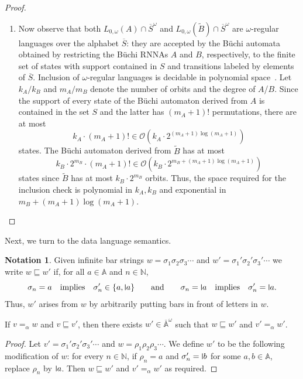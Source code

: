 \documentclass[final,a4paper,UKenglish,thm-restate,autoref,numberwithinsect]{lipics-v2021}
\newcommand{\midmid}{\hspace{0.2ex}{\rule[-0.1ex]{0.6pt}{1.65ex}}\hspace{0.2ex}}
\newcommand{\newletter}[1]{{\midmid}#1}
\newcommand{\barA}{\overline{\names}}
\numberwithin{equation}{section}
\newcommand{\CO}{\mathcal{O}}
\newcommand{\ol}{\overline}
\newcommand{\tl}{\widetilde}
\newcommand{\Nat}{{\mathbb{N}}}
\newcommand{\+}[1]{\mathcal{#1}\xspace}
\newcommand{\names}{\mathbb{A}}
\theoremstyle{definition}
\newtheorem{nota}[theorem]{Notation}
\begin{document}
\begin{proof}
\begin{enumerate}
  \item Now observe that both $L_{0,\omega}(A)\cap \ol{S}^\omega$ and
    $L_{0,\omega}(\tl{B})\cap \ol{S}^\omega$ are $\omega$-regular
    languages over the alphabet $\ol{S}$: they are accepted by the
    Büchi automata obtained by restricting the Büchi RNNAs $A$ and
    $B$, respectively, to the finite set of states with support
    contained in $S$ and transitions labeled by elements of
    $\ol{S}$. Inclusion of $\omega$-regular languages is decidable in
    polynomial space~\cite{kv96}. Let $k_A/k_B$ and $m_A/m_B$ denote
    the number of orbits and the degree of $A$/$B$. Since the support
    of every state of the Büchi automaton derived from $A$ is contained in
    the set $S$ and the latter has $(m_A+1)!$ permutations, there are at most
    \[
      k_A\cdot (m_A+1)!
      \in 
      \CO(k_A\cdot 2^{(m_A+1)\log (m_A+1)})
    \]
    states.
    The Büchi automaton derived from $\tl{B}$ has at most
    \[
      k_B\cdot 2^{m_B}\cdot (m_A+1)!
      \in
      \CO(k_B\cdot 2^{m_B + (m_A+1)\log (m_A+1)})
    \]
    states 
    since $\tl{B}$ has at most $k_B\cdot 2^{m_B}$ orbits. Thus, the
    space required for the inclusion check is polynomial in $k_A, k_B$
    and exponential in $m_B+(m_A+1)\log (m_A+1)$.\qedhere
  \end{enumerate}
\end{proof}

\noindent Next, we turn to the data language semantics. 
%
\begin{nota}
  Given infinite bar strings $w=\sigma_1\sigma_2\sigma_3\cdots$ and
  $w'=\sigma_1'\sigma_2'\sigma_3'\cdots$ we write $w\sqsubseteq w'$ if,
  for all $a\in \names$ and $n\in \Nat$,
  \[ \sigma_n=a
    \quad\text{implies}\quad
    \sigma_n'\in \{a,\newletter a\}
    \qquad\text{and}\qquad
    \sigma_n=\newletter a
    \quad\text{implies}\quad
    \sigma_n'=\newletter a.
  \]
  Thus, $w'$ arises from $w$ by arbitrarily putting bars in front of letters in $w$.
\end{nota}
%
\begin{lemma}\label{lem:order-rel}
  If $v=_\alpha w$ and $v\sqsubseteq v'$, then there exists
  $w'\in \barA^\omega$ such that $w\sqsubseteq w'$ and $v'=_\alpha w'$.
\end{lemma}
%
\begin{proof}
  Let $v'=\sigma_1'\sigma_2'\sigma_3'\cdots$ and
  $w=\rho_1\rho_2\rho_3\cdots$.  We define $w'$ to be the following
  modification of $w$: for every $n\in \Nat$, if $\rho_n=a$ and
  $\sigma_n'=\newletter b$ for some $a,b\in \names$, replace $\rho_n$
  by $\newletter a$. Then $w\sqsubseteq w'$ and $v'=_\alpha w'$ as
  required.
\end{proof}
\end{document}

